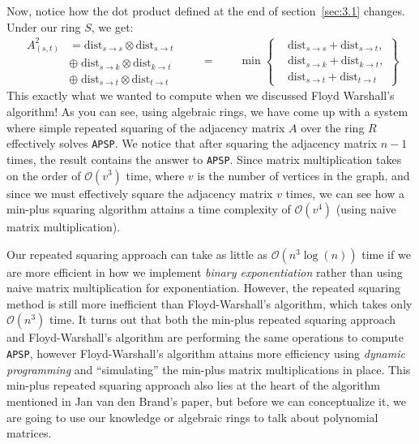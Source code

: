 \documentclass[12pt]{article}
\newcommand{\bigO}{\mathcal{O}}
\begin{document}
Now, notice how the dot product defined at the end of section~\ref{sec:3.1} changes. Under our ring $S$, we get:
\[
    \begin{split}
        A^2_{(s,t)}
        &= \mathrm{dist}_{s \to s} \otimes \mathrm{dist}_{s \to t} \\
        &\oplus \; \mathrm{dist}_{s \to k} \otimes \mathrm{dist}_{k \to t} \\
        &\oplus \; \mathrm{dist}_{s \to t} \otimes \mathrm{dist}_{t \to t}
    \end{split}
    \qquad = \qquad
    \min\!\left\{
        \begin{aligned}
            &\mathrm{dist}_{s\to s} + \mathrm{dist}_{s\to t},\\
            &\mathrm{dist}_{s\to k} + \mathrm{dist}_{k\to t},\\
            &\mathrm{dist}_{s\to t} + \mathrm{dist}_{t\to t}
        \end{aligned}
    \right\}
\]
This exactly what we wanted to compute when we discussed Floyd Warshall's algorithm! As you can see, using algebraic rings, we have come up with a system where simple repeated squaring of the adjacency matrix $A$ over the ring $R$ effectively solves \texttt{APSP}. We notice that after squaring the adjacency matrix $n - 1$ times, the result contains the answer to \texttt{APSP}. Since matrix multiplication takes on the order of $\bigO(v^3)$ time, where $v$ is the number of vertices in the graph, and since we must effectively square the adjacency matrix $v$ times, we can see how a min-plus squaring algorithm attains a time complexity of $\bigO(v^4)$ (using naive matrix multiplication).

Our repeated squaring approach can take as little as $\bigO(n^3 \log(n))$ time if we are more efficient in how we implement \emph{binary exponentiation} rather than using naive matrix multiplication for exponentiation. However, the repeated squaring method is still more inefficient than Floyd-Warshall's algorithm, which takes only $\bigO(n^3)$ time. It turns out that both the min-plus repeated squaring approach and Floyd-Warshall's algorithm are performing the same operations to compute \texttt{APSP}, however Floyd-Warshall's algorithm attains more efficiency using \emph{dynamic programming} and ``simulating'' the min-plus matrix multiplications in place. This min-plus repeated squaring approach also lies at the heart of the algorithm mentioned in Jan van den Brand's paper, but before we can conceptualize it, we are going to use our knowledge or algebraic rings to talk about polynomial matrices.
\end{document}
